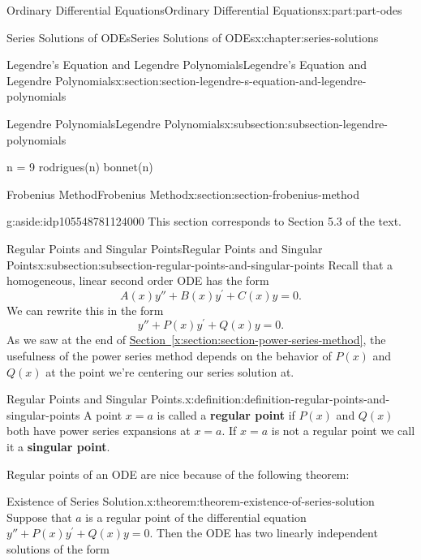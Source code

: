 \documentclass[oneside,10pt,]{book}
\newcommand{\xreffont}{\relax}
\newcommand{\terminology}[1]{\textbf{#1}}
\numberwithin{equation}{part}
\begin{document}
\begin{partptx}{Ordinary Differential Equations}{}{Ordinary Differential Equations}{}{}{x:part:part-odes}
\begin{chapterptx}{Series Solutions of ODEs}{}{Series Solutions of ODEs}{}{}{x:chapter:series-solutions}
\begin{sectionptx}{Legendre's Equation and Legendre Polynomials}{}{Legendre's Equation and Legendre Polynomials}{}{}{x:section:section-legendre-s-equation-and-legendre-polynomials}
\begin{subsectionptx}{Legendre Polynomials}{}{Legendre Polynomials}{}{}{x:subsection:subsection-legendre-polynomials}
\begin{sageinput}
n = 9
rodrigues(n)
bonnet(n)
\end{sageinput}
\end{subsectionptx}
\end{sectionptx}
%
%
\typeout{************************************************}
\typeout{************************************************}
%
\begin{sectionptx}{Frobenius Method}{}{Frobenius Method}{}{}{x:section:section-frobenius-method}
\begin{aside}{}{g:aside:idp105548781124000}%
This section corresponds to Section 5.3 of the text.%
\end{aside}
%
%
\typeout{************************************************}
\typeout{************************************************}
%
\begin{subsectionptx}{Regular Points and Singular Points}{}{Regular Points and Singular Points}{}{}{x:subsection:subsection-regular-points-and-singular-points}
Recall that a homogeneous, linear second order ODE has the form%
\begin{equation*}
A(x)y''+B(x)y^\prime+C(x)y = 0.
\end{equation*}
We can rewrite this in the form%
\begin{equation*}
y''+P(x)y^\prime+Q(x)y = 0.
\end{equation*}
As we saw at the end of \hyperref[x:section:section-power-series-method]{Section~{\xreffont\ref{x:section:section-power-series-method}}}, the usefulness of the power series method depends on the behavior of \(P(x)\) and \(Q(x)\) at the point we're centering our series solution at.%
\begin{definition}{Regular Points and Singular Points.}{x:definition:definition-regular-points-and-singular-points}%
%
A point \(x=a\) is called a \terminology{regular point} if \(P(x)\) and \(Q(x)\) both have power series expansions at \(x=a\). If \(x=a\) is not a regular point we call it a \terminology{singular point}.%
\end{definition}
Regular points of an ODE are nice because of the following theorem:%
\begin{theorem}{Existence of Series Solution.}{}{x:theorem:theorem-existence-of-series-solution}%
%
Suppose that \(a\) is a regular point of the differential equation \(y''+P(x)y^\prime+Q(x)y=0\). Then the ODE has two linearly independent solutions of the form%

\end{theorem}
\end{subsectionptx}
\end{sectionptx}
\end{chapterptx}
\end{partptx}
\end{document}
